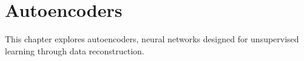 
\chapter{Autoencoders}
\label{chap:autoencoders}

This chapter explores autoencoders, neural networks designed for unsupervised learning through data reconstruction.






